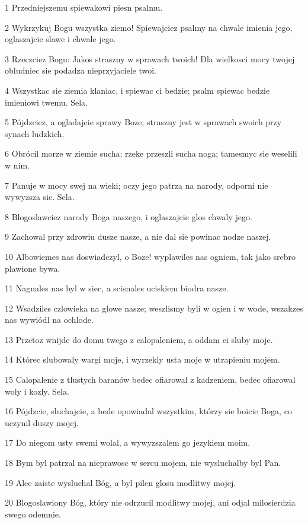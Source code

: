 \par 1 Przedniejszemu spiewakowi piesn psalmu.
\par 2 Wykrzykuj Bogu wszystka ziemo! Spiewajciez psalmy na chwale imienia jego, oglaszajcie slawe i chwale jego.
\par 3 Rzeczciez Bogu: Jakos straszny w sprawach twoich! Dla wielkosci mocy twojej obludniec sie podadza nieprzyjaciele twoi.
\par 4 Wszystkac sie ziemia klaniac, i spiewac ci bedzie; psalm spiewac bedzie imieniowi twemu. Sela.
\par 5 Pójdzciez, a ogladajcie sprawy Boze; straszny jest w sprawach swoich przy synach ludzkich.
\par 6 Obrócil morze w ziemie sucha; rzeke przeszli sucha noga; tamesmyc sie weselili w nim.
\par 7 Panuje w mocy swej na wieki; oczy jego patrza na narody, odporni nie wywyzsza sie. Sela.
\par 8 Blogoslawciez narody Boga naszego, i oglaszajcie glos chwaly jego.
\par 9 Zachowal przy zdrowiu dusze nasze, a nie dal sie powinac nodze naszej.
\par 10 Albowiemes nas doswiadczyl, o Boze! wyplawiles nas ogniem, tak jako srebro plawione bywa.
\par 11 Nagnales nas byl w siec, a scisnales uciskiem biodra nasze.
\par 12 Wsadziles czlowieka na glowe nasze; weszlismy byli w ogien i w wode, wszakzes nas wywiódl na ochlode.
\par 13 Przetoz wnijde do domu twego z calopaleniem, a oddam ci sluby moje.
\par 14 Którec slubowaly wargi moje, i wyrzekly usta moje w utrapieniu mojem.
\par 15 Calopalenie z tlustych baranów bedec ofiarowal z kadzeniem, bedec ofiarowal woly i kozly. Sela.
\par 16 Pójdzcie, sluchajcie, a bede opowiadal wszystkim, którzy sie boicie Boga, co uczynil duszy mojej.
\par 17 Do niegom usty swemi wolal, a wywyzszalem go jezykiem moim.
\par 18 Bym byl patrzal na nieprawosc w sercu mojem, nie wysluchalby byl Pan.
\par 19 Alec zaiste wysluchal Bóg, a byl pilen glosu modlitwy mojej.
\par 20 Blogoslawiony Bóg, który nie odrzucil modlitwy mojej, ani odjal milosierdzia swego odemnie.

